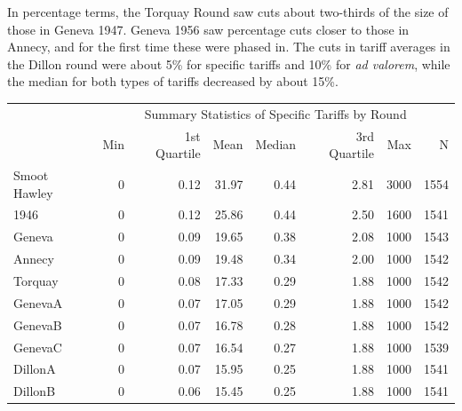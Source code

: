 \documentclass[
  12pt,
]{article}
\begin{document}
In percentage terms, the Torquay Round saw cuts about two-thirds of the size of those in Geneva 1947. Geneva 1956 saw percentage cuts closer to those in Annecy, and for the first time these were phased in. The cuts in tariff averages in the Dillon round were about 5\% for specific tariffs and 10\% for \emph{ad valorem}, while the median for both types of tariffs decreased by about 15\%.

\begin{table}[!h]
\centering
\begin{tabular}[t]{lrrrrrrr}
\toprule
\multicolumn{1}{c}{\bgroup\fontsize{12}{14}\selectfont  \egroup{}} & \multicolumn{7}{c}{\bgroup\fontsize{12}{14}\selectfont Summary Statistics of Specific Tariffs by Round\egroup{}} \\
\cmidrule(l{3pt}r{3pt}){2-8}
  & Min & 1st Quartile & Mean & Median & 3rd Quartile & Max & N\\
\midrule
Smoot Hawley & 0 & 0.12 & 31.97 & 0.44 & 2.81 & 3000 & 1554\\
1946 & 0 & 0.12 & 25.86 & 0.44 & 2.50 & 1600 & 1541\\
Geneva & 0 & 0.09 & 19.65 & 0.38 & 2.08 & 1000 & 1543\\
Annecy & 0 & 0.09 & 19.48 & 0.34 & 2.00 & 1000 & 1542\\
Torquay & 0 & 0.08 & 17.33 & 0.29 & 1.88 & 1000 & 1542\\
\addlinespace
GenevaA & 0 & 0.07 & 17.05 & 0.29 & 1.88 & 1000 & 1542\\
GenevaB & 0 & 0.07 & 16.78 & 0.28 & 1.88 & 1000 & 1542\\
GenevaC & 0 & 0.07 & 16.54 & 0.27 & 1.88 & 1000 & 1539\\
DillonA & 0 & 0.07 & 15.95 & 0.25 & 1.88 & 1000 & 1541\\
DillonB & 0 & 0.06 & 15.45 & 0.25 & 1.88 & 1000 & 1541\\
\bottomrule
\end{tabular}
\end{table}
\end{document}
